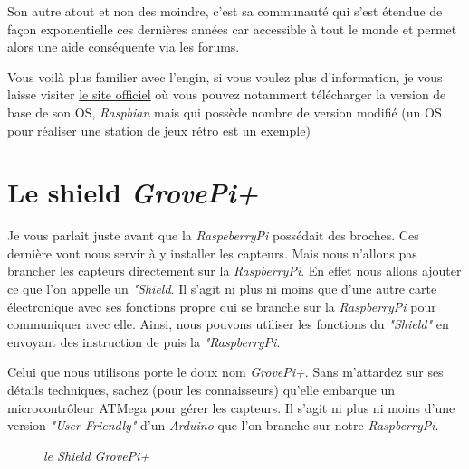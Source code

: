 Son autre atout et non des moindre, c'est sa communauté qui s'est étendue de façon exponentielle ces dernières années car accessible à tout le monde et permet alors une aide conséquente via les forums.

Vous voilà plus familier avec l'engin, si vous voulez plus d'information, je vous laisse visiter \href{https://www.raspberrypi.org/}{le site officiel} où vous pouvez notamment télécharger la version de base de son OS, \textit{Raspbian} mais qui possède nombre de version modifié (un OS pour réaliser une station de jeux rétro est un exemple)

\section{Le shield \textit{GrovePi+}}

Je vous parlait juste avant que la \textit{RaspeberryPi} possédait des broches. Ces dernière vont nous servir à y installer les capteurs. Mais nous n'allons pas brancher les capteurs directement sur la \textit{RaspberryPi}. En effet nous allons ajouter ce que l'on appelle un \textit{"Shield}. Il s'agit ni plus ni moins que d'une autre carte électronique avec ses fonctions propre qui se branche sur la \textit{RaspberryPi} pour communiquer avec elle. Ainsi, nous pouvons utiliser les fonctions du \textit{"Shield"} en envoyant des instruction de puis la \textit{"RaspberryPi}.

Celui que nous utilisons porte le doux nom \textit{GrovePi+}. Sans m'attardez sur ses détails techniques, sachez (pour les connaisseurs) qu'elle embarque un microcontrôleur ATMega pour gérer les capteurs. Il s'agit ni plus ni moins d'une version \textit{"User Friendly"} d'un \textit{Arduino} que l'on branche sur notre \textit{RaspberryPi}.\\

\begin{figure}[H]
\begin{center}
\end{center}
	\caption{ \textit{le Shield GrovePi+}}
\end{figure}\\



